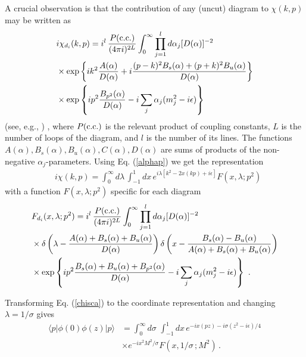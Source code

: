 \documentclass[final,5p,times,twocolumn]{elsarticle}
\newcommand{\nn}{\nonumber \\ }
\begin{document}
 A crucial observation is that  the contribution of 
 any  (uncut) diagram  to $\chi (k,p) $
 may be written as  
\begin{align}
  &i  \chi_{d_i}  (k,p) =  i^{l} \, \frac{P({\rm c.c.})}{(4\pi i)^{2L}}
\int_0^{\infty} \prod_{j=1}^l   d\alpha_{j} [D(\alpha)]^{-2}
\nonumber \\ & \times 
\exp \left \{ i k^2  \frac{A (\alpha)}{D(\alpha) } +i 
  \frac{ (p-k)^2 B_s (\alpha)+   (p+k)^2 B_u (\alpha) }{D(\alpha) }
 \right \} 
\nonumber \\ & \times 
\exp \left \{ 
i  p^2  \frac{ B_{p^2} (\alpha) }{D (\alpha) }
- i  \sum_{j} \alpha_{j} (m_{j}^2- i\epsilon) \right \}  
\label{alphap0}
\end{align}
(see, e.g., \cite{Nakanishi:1971graph}) , 
where    ${P({\rm c.c.})}$ is the relevant
 product of  coupling constants, 
 $L$ is the number of loops of the diagram,  and $l$
is the number  of its
 lines. The  functions
$A(\alpha), B_s(\alpha),  B_u(\alpha),  C(\alpha), D(\alpha)$ 
are   sums of products
of the non-negative $\alpha_j$-parameters.  
Using Eq. (\ref{alphap})  we get the representation 
\begin{align} 
& i \chi (k,p)  = \int_{0}^{\infty} d\lambda  \,  \int_{-1}^{1} d x \,
e^{i  \lambda[  k^2 - 2x (kp) +i\epsilon]} F(x, \lambda;p^2)  
\label{chisca} %
\end{align}
 with a  function $F(x, \lambda;p^2)$  specific 
for each diagram 
\begin{align}
&F_{d_i} (x, \lambda;p^2)    =  i^{l} \, \frac{P({\rm c.c.})}{(4\pi i)^{2L}}
\int_0^{\infty} \prod_{j=1}^l   d\alpha_{j} [D(\alpha)]^{-2}
\nonumber \\ & \times 
\delta \left ( \lambda -  \frac{A(\alpha)+ B_s(\alpha) +  B_u(\alpha)}{D(\alpha) }  \right ) 
\delta \left ( x -  \frac{B_s(\alpha) -  B_u(\alpha)}{A(\alpha)+ B_s(\alpha) +  B_u(\alpha)} \right ) 
 \nn & \times 
\exp \left \{ 
 i p^2  \frac{  B_s (\alpha)+    B_u (\alpha) +B_{p^2} (\alpha) }{D(\alpha) }
- i  \sum_{j} \alpha_{j} (m_{j}^2- i\epsilon) \right \}   \  .
\label{alphap}
\end{align}


 Transforming  Eq.  (\ref{chisca})   to the coordinate 
representation and changing $\lambda =1/\sigma$  gives
 \begin{align}
  \langle p |   \phi(0) \phi (z)|p \rangle&  
=   \int_{0}^{\infty} {d\sigma} \,
  \,   \int_{-1}^{1} d x \, 
  e^{-i x (pz) -i \sigma {(z^2-i \epsilon )}/{4}} \nn & \times 
e^{-i  x^2 M^2/\sigma} F  (x, 1/\sigma\, ; M^2)
	  \,  . 
 \
 \label{newTpqx2}
\end{align} 
\end{document}

